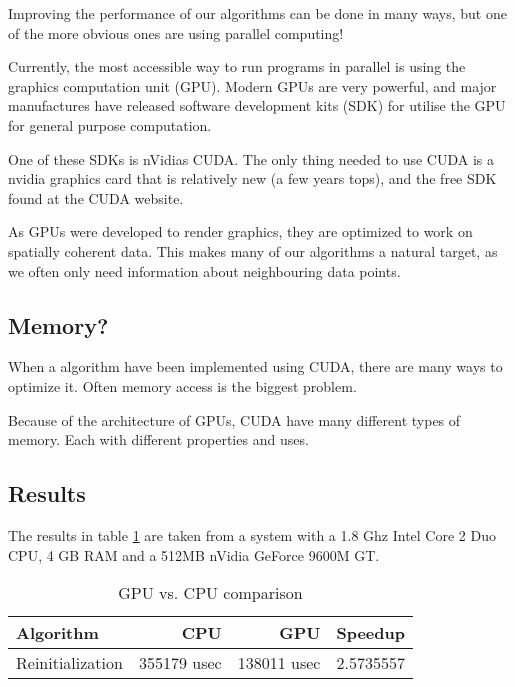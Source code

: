 
Improving the performance of our algorithms can be done in many ways,
but one of the more obvious ones are using parallel computing!

Currently, the most accessible way to run programs in parallel is
using the graphics computation unit (GPU). Modern GPUs are very
powerful, and major manufactures have released software development
kits (SDK) for utilise the GPU for general purpose computation.

One of these SDKs is nVidias CUDA. The only thing needed to
use CUDA is a nvidia graphics card that is relatively new (a few years
tops), and the free SDK found at the CUDA website.

As GPUs were developed to render graphics, they are optimized to work
on spatially coherent data. This makes many of our algorithms a
natural target, as we often only need information about neighbouring
data points.

\subsection{Memory?}

When a algorithm have been implemented using CUDA, there are many ways
to optimize it. Often memory access is the biggest problem.

Because of the architecture of GPUs, CUDA have many different types of
memory. Each with different properties and uses.



\subsection{Results}

The results in table \ref{tbl:cudaRes} are taken from a system with a
1.8 Ghz Intel Core 2 Duo CPU, 4 GB RAM and a 512MB nVidia GeForce
9600M GT.

\begin{table}[h]
  \centering
  \begin{tabular}{|l|r|r|r|}
    \hline    Algorithm & CPU & GPU & Speedup \\
\hline
Reinitialization & 355179 usec & 138011 usec & 2.5735557 \\
\hline
  \end{tabular}
  \caption{GPU vs. CPU comparison}
  \label{tbl:cudaRes}
\end{table}

